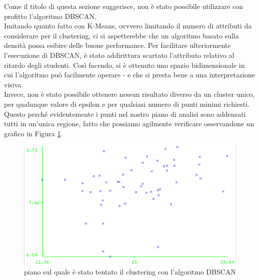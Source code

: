     Come il titolo di questa sezione suggerisce, non è stato possibile utilizzare con profitto l'algoritmo DBSCAN. \\

    Imitando quanto fatto con K-Means, ovvvero limitando il numero di attributi da considerare per il clustering, ci si aspetterebbe che un algoritmo basato sulla densità possa esibire delle buone performance. Per facilitare ulteriormente l'esecuzione di DBSCAN, è stato addirittura scartato l'attributo relativo al ritardo degli studenti. Così facendo, si è ottenuto uno spazio bidimensionale in cui l'algoritmo può facilmente operare - e che si presta bene a una interpretazione visiva. \\

    Invece, non è stato possibile ottenere nessun risultato diverso da un cluster unico, per qualunque valore di epsilon e per qualsiasi numero di punti minimi richiesti. Questo perché evidentemente i punti nel nostro piano di analisi sono addensati tutti in un'unica regione, fatto che possiamo agilmente verificare osservandone un grafico in Figura \ref{dbscan}.

    \begin{figure}
        \centering
        \caption{piano sul quale è stato tentato il clustering con l'algoritmo DBSCAN}
        \label{dbscan}
        \includegraphics[scale=0.5]{../cluster/dbscan.png}
    \end{figure}